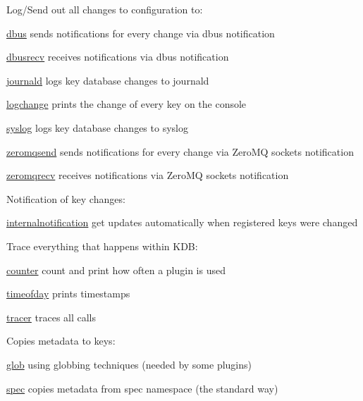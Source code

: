 Log/\+Send out all changes to configuration to\+:


\begin{DoxyItemize}
\item \hyperlink{autotoc_md153_src_plugins_dbus_README_md}{dbus} sends notifications for every change via dbus {\ttfamily notification}
\item \hyperlink{autotoc_md165_src_plugins_dbusrecv_README_md}{dbusrecv} receives notifications via dbus {\ttfamily notification}
\item \hyperlink{autotoc_md348_src_plugins_journald_README_md}{journald} logs key database changes to journald
\item \hyperlink{autotoc_md390_src_plugins_logchange_README_md}{logchange} prints the change of every key on the console
\item \hyperlink{autotoc_md666_src_plugins_syslog_README_md}{syslog} logs key database changes to syslog
\item \hyperlink{autotoc_md1004_src_plugins_zeromqsend_README_md}{zeromqsend} sends notifications for every change via Zero\+MQ sockets {\ttfamily notification}
\item \hyperlink{autotoc_md998_src_plugins_zeromqrecv_README_md}{zeromqrecv} receives notifications via Zero\+MQ sockets {\ttfamily notification}
\end{DoxyItemize}

Notification of key changes\+:


\begin{DoxyItemize}
\item \hyperlink{autotoc_md318_src_plugins_internalnotification_README_md}{internalnotification} get updates automatically when registered keys were changed
\end{DoxyItemize}

Trace everything that happens within K\+DB\+:


\begin{DoxyItemize}
\item \hyperlink{autotoc_md106_src_plugins_counter_README_md}{counter} count and print how often a plugin is used
\item \hyperlink{autotoc_md690_src_plugins_timeofday_README_md}{timeofday} prints timestamps
\item \hyperlink{autotoc_md800_src_plugins_tracer_README_md}{tracer} traces all calls
\end{DoxyItemize}

Copies metadata to keys\+:


\begin{DoxyItemize}
\item \hyperlink{autotoc_md238_src_plugins_glob_README_md}{glob} using globbing techniques (needed by some plugins)
\item \hyperlink{autotoc_md645_src_plugins_spec_README_md}{spec} copies metadata from spec namespace (the standard way)
\end{DoxyItemize}

